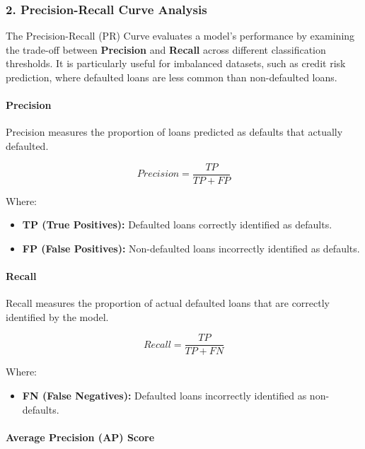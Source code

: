 \documentclass[11pt]{article}
\providecommand{\tightlist}{%
      \setlength{\itemsep}{0pt}\setlength{\parskip}{0pt}}
\begin{document}
\subsubsection{\texorpdfstring{\textbf{2. Precision-Recall Curve
Analysis}}{2. Precision-Recall Curve Analysis}}\label{precision-recall-curve-analysis}

The Precision-Recall (PR) Curve evaluates a model's performance by
examining the trade-off between \textbf{Precision} and \textbf{Recall}
across different classification thresholds. It is particularly useful
for imbalanced datasets, such as credit risk prediction, where defaulted
loans are less common than non-defaulted loans.

\paragraph{Precision}\label{precision}

Precision measures the proportion of loans predicted as defaults that
actually defaulted.

\[
Precision = \frac{TP}{TP + FP}
\]

Where:

\begin{itemize}
\tightlist
\item
  \textbf{TP (True Positives):} Defaulted loans correctly identified as
  defaults.
\item
  \textbf{FP (False Positives):} Non-defaulted loans incorrectly
  identified as defaults.
\end{itemize}

\paragraph{Recall}\label{recall}

Recall measures the proportion of actual defaulted loans that are
correctly identified by the model.

\[
Recall = \frac{TP}{TP + FN}
\]

Where:

\begin{itemize}
\tightlist
\item
  \textbf{FN (False Negatives):} Defaulted loans incorrectly identified
  as non-defaults.
\end{itemize}

\paragraph{Average Precision (AP)
Score}\label{average-precision-ap-score}
\end{document}
